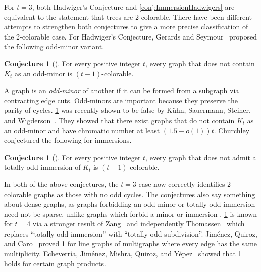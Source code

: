\documentclass{article}
\theoremstyle{definition}
\newtheorem{conjecture}[environment]{Conjecture}
\begin{document}
For $t = 3$, both Hadwiger's Conjecture and \cref{conj:ImmersionHadwigers} are equivalent to the statement that trees are 2-colorable. There have been different attempts to strengthen both conjectures to give a more precise classification of the 2-colorable case. For Hadwiger's Conjecture, Gerards and Seymour~\cite{Jensen1995GraphColoring} proposed the following odd-minor variant.

\begin{conjecture}[{\cite{Jensen1995GraphColoring}}]\label{conj:oddHadwigers}
    For every positive integer $t$, every graph that does not contain $K_{t}$ as an odd-minor is $(t-1)$-colorable.
\end{conjecture}

A graph is an \emph{odd-minor} of another if it can be formed from a subgraph via contracting edge cuts. Odd-minors are important because they preserve the parity of cycles. \cref{conj:oddHadwigers} was recently shown to be false by K{\"u}hn, Sauermann, Steiner, and Wigderson~\cite{kuhn2025disproof}. They showed that there exist graphs that do not contain $K_t$ as an odd-minor and have chromatic number at least $(1.5 - o(1))t$. Churchley~\cite{Churchley2017Odd} conjectured the following for immersions.

\begin{conjecture}[{\cite{Churchley2017Odd}}]\label{conj:OddImmersionHadwigers}
    For every positive integer $t$, every graph that does not admit a totally odd immersion of $K_{t}$ is $(t-1)$-colorable.
\end{conjecture}

In both of the above conjectures, the $t=3$ case now correctly identifies 2-colorable graphs as those with no odd cycles. The conjectures also say something about dense graphs, as graphs forbidding an odd-minor or totally odd immersion need not be sparse, unlike graphs which forbid a minor \cite{kostochka1984lower, thomason1984extremal} or immersion \cite{Devos2014Minimum}. \cref{conj:OddImmersionHadwigers} is known for $t=4$ via a stronger result of Zang~\cite{Zang1998proof} and independently Thomassen~\cite{Thomassen2001totally} which replaces ``totally odd immersion'' with ``totally odd subdivision''. Jim\'{e}nez, Quiroz, and Caro~\cite{Jimenez2024totally} proved \cref{conj:OddImmersionHadwigers} for line graphs of multigraphs where every edge has the same multiplicity. Echeverr\'{i}a, Jim\'{e}nez, Mishra, Quiroz, and Y\'{e}pez~\cite{echeverria2025totally} showed that \cref{conj:OddImmersionHadwigers} holds for certain graph products. 
\end{document}
